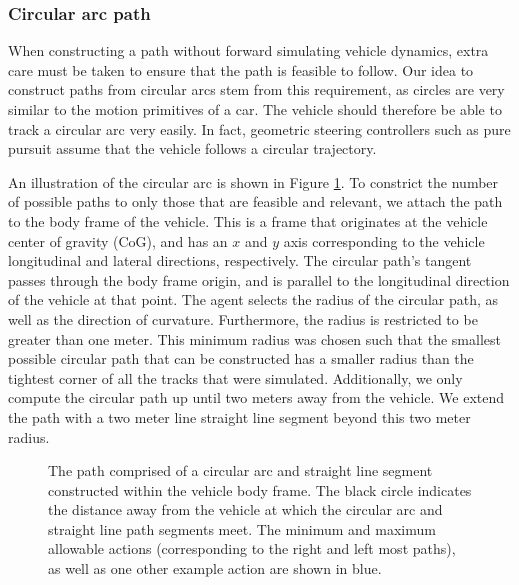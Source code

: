 
\subsubsection{Circular arc path}
When constructing a path without forward simulating vehicle dynamics, extra care must be taken to ensure that the path is feasible to follow.
Our idea to construct paths from circular arcs stem from this requirement, as circles are very similar to the motion primitives of a car.
The vehicle should therefore be able to track a circular arc very easily.
In fact, geometric steering controllers such as pure pursuit assume that the vehicle follows a circular trajectory.

An illustration of the circular arc is shown in Figure \ref{fig:circular_arc_path}.
To constrict the number of possible paths to only those that are feasible and relevant, we attach the path to the body frame of the vehicle.
This is a frame that originates at the vehicle center of gravity (CoG), and has an $x$ and $y$ axis corresponding to the vehicle longitudinal and lateral directions, respectively.
The circular path's tangent passes through the body frame origin, and is parallel to the longitudinal direction of the vehicle at that point.
The agent selects the radius of the circular path, as well as the direction of curvature.
Furthermore, the radius is restricted to be greater than one meter.
This minimum radius was chosen such that the smallest possible circular path that can be constructed has a smaller radius than the tightest corner of all the tracks that were simulated.
Additionally, we only compute the circular path up until two meters away from the vehicle.
We extend the path with a two meter line straight line segment beyond this two meter radius.

\begin{figure}[htb!]
    \centering
    
    \caption[The circular arc path]{The path comprised of a circular arc and straight line segment constructed within the vehicle body frame. The black circle indicates the distance away from the vehicle at which the circular arc and straight line path segments meet. The minimum and maximum allowable actions (corresponding to the right and left most paths), as well as one other example action are shown in blue.}
    \label{fig:circular_arc_path}
\end{figure}

